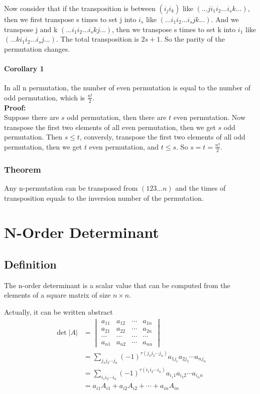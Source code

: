\documentclass{article}
\begin{document}
Now consider that if the transposition is between $(i_{j}i_{k})$ like 
$(...ji_{1}i_{2}...i_{s}k...)$, 
then we first transpose s times to set j into $i_{s}$ like 
$(...i_{1}i_{2}...i_{s}jk...)$. 
And we transpose j and k 
$(...i_{1}i_{2}...i_{s}kj...)$, 
then we transpose s times to set k into $i_{1}$ like 
$(...ki_{1}i_{2}...i_{s}j...)$.
The total transposition is $2s+1$. 
So the parity of the permutation changes.

\paragraph{Corollary 1}
In all n permutation, the number of even permutation 
is equal to the number of odd permutation, which is 
$\frac{n!}{2}$.\\
\textbf{Proof:}\\
Suppose there are $s$ odd permutation, then there are
$t$ even permutation. Now transpose the first two elements 
of all even permutation, then we get $s$ odd permutation.
Then $s\leq t$, conversly, transpose the first two elements 
of all odd permutation, then we get $t$ even permutation, and 
$t\leq s$. So $s=t=\frac{n!}{2}$.

\subsubsection{Theorem}
Any n-permutation can be transposed from $(123...n)$ and the times 
of transposition equals to the inversion number of the permutation.

\section{N-Order Determinant}
\subsection{Definition}
The n-order determinant is a scalar value that can be computed from 
the elements of a square matrix of size $n\times n$.

Actually, it can be written abstract
\begin{align*}
\det |A|  
& =
\begin{vmatrix}
    a_{11} & a_{12} & \cdots & a_{1n}\\
    a_{21} & a_{22} & \cdots & a_{2n}\\
    \cdots & \cdots & \cdots & \cdots\\
    a_{n1} & a_{n2} & \cdots & a_{nn}
\end{vmatrix} \\
& = \sum_{j_{1}j_{2}\cdots j_{n}}(-1)^{\tau (j_{1}j_{2}\cdots j_{n})} a_{1j_{1}}a_{2j_{2}}\cdots a_{nj_{n}} \\
& = \sum_{i_{1}i_{2}\cdots i_{n}}(-1)^{\tau (i_{1}i_{2}\cdots i_{n})} a_{i_{1}1}a_{i_{2}2}\cdots a_{i_{n}n} \\
& = a_{i1}A_{i1}+a_{i2}A_{i2}+\cdots+a_{in}A_{in}
\end{align*}
\end{document}
